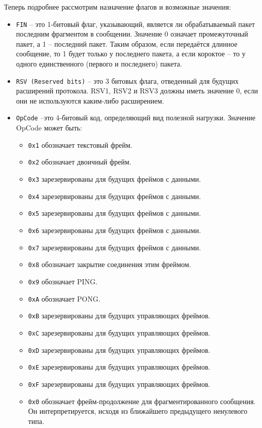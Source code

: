 Теперь подробнее рассмотрим назначение флагов и возможные значения:
\begin{itemize}
\item \texttt{FIN} -- это 1-битовый флаг, указывающий, является ли обрабатываемый пакет последним фрагментом в сообщении. Значение 0 означает промежуточный пакет, а 1 -- последний пакет. Таким образом, если передаётся длинное сообщение, то 1 будет только у последнего пакета, а если короктое -- то у одного единственного (первого и последнего) пакета.
\item \texttt{RSV (Reserved bits)} -- это 3 битовых флага, отведенный для будущих расширений протокола. RSV1, RSV2 и RSV3 должны иметь значение 0, если они не используются каким-либо расширением.
\item \texttt{OpCode} --это 4-битовый код, определяющий вид полезной нагрузки. Значение OpCode может быть:
\begin{itemize}
	\item \texttt{0x1} обозначает текстовый фрейм.
    \item \texttt{0x2} обозначает двоичный фрейм.
    \item \texttt{0x3} зарезервированы для будущих фреймов с данными.
    \item \texttt{0x4} зарезервированы для будущих фреймов с данными.
    \item \texttt{0x5} зарезервированы для будущих фреймов с данными.
    \item \texttt{0x6} зарезервированы для будущих фреймов с данными.
    \item \texttt{0x7} зарезервированы для будущих фреймов с данными.
    \item \texttt{0x8} обозначает закрытие соединения этим фреймом.
    \item \texttt{0x9} обозначает PING.
    \item \texttt{0xA} обозначает PONG.
    \item \texttt{0xB} зарезервированы для будущих управляющих фреймов.
    \item \texttt{0xC} зарезервированы для будущих управляющих фреймов.
    \item \texttt{0xD} зарезервированы для будущих управляющих фреймов.
    \item \texttt{0xE} зарезервированы для будущих управляющих фреймов.
    \item \texttt{0xF} зарезервированы для будущих управляющих фреймов.
    \item \texttt{0x0} обозначает фрейм-продолжение для фрагментированного сообщения. Он интерпретируется, исходя из ближайшего предыдущего ненулевого типа.

\end{itemize}
\end{itemize}
